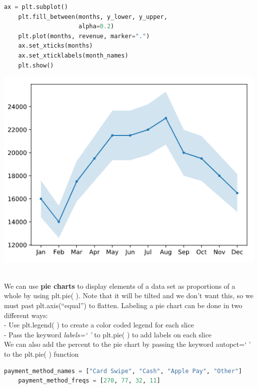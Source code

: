 \documentclass[11pt, a4paper]{article}
\begin{document}
\begin{spacing}{1.1}
\begin{minipage}[c]{9.2cm}
\begin{lstlisting}[language=Python]
	ax = plt.subplot()
	plt.fill_between(months, y_lower, y_upper, 
	                 alpha=0.2)
	plt.plot(months, revenue, marker=".")
	ax.set_xticks(months)
	ax.set_xticklabels(month_names)
	plt.show() \end{lstlisting}\vspace*{1mm}
	\end{minipage}
	\begin{minipage}[c]{8cm}
		\includegraphics[scale=.57]{lineerr}
	\end{minipage} \vspace*{1mm} \\
	We can use \textbf{pie charts} to display elements of a data set as proportions of a whole by using plt.pie( ). Note that it will be tilted and we don't want this, so we must past plt.axis(``equal'') to flatten. Labeling a pie chart can be done in two different ways: \\ 
	\hspace*{3mm} - Use plt.legend( ) to create a color coded legend for each slice \\
	\hspace*{3mm} - Pass the keyword \textit{labels=` '} to plt.pie( ) to add labels on each slice \\
	We can also add the percent to the pie chart by passing the keyword autopct=` ' to the plt.pie( ) function
	\begin{lstlisting}[language=Python]
	payment_method_names = ["Card Swipe", "Cash", "Apple Pay", "Other"]
	payment_method_freqs = [270, 77, 32, 11]
	

\end{lstlisting}
\end{spacing}
\end{document}
